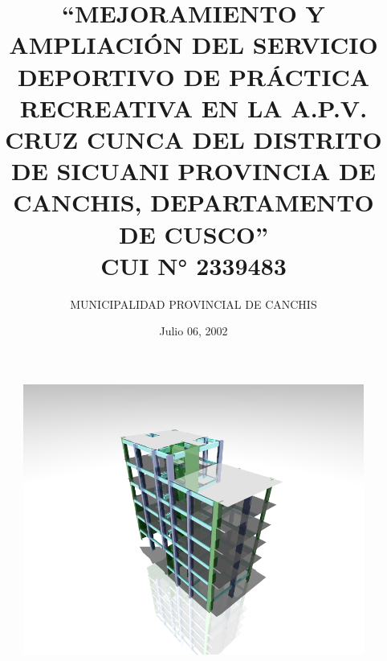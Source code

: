 \documentclass[12pt,addpoints]{article}
\title{\textbf{``MEJORAMIENTO Y AMPLIACIÓN DEL SERVICIO DEPORTIVO DE PRÁCTICA RECREATIVA EN LA A.P.V. CRUZ CUNCA DEL DISTRITO DE SICUANI PROVINCIA DE CANCHIS, DEPARTAMENTO DE CUSCO''\\
CUI N° 2339483
}}
\author{MUNICIPALIDAD PROVINCIAL DE CANCHIS}
\date{Julio 06, 2002}
\renewcommand{\headrulewidth}{0.4pt}
\renewcommand{\footrulewidth}{0.4pt}
\begin{document}
\maketitle
\begin{figure}[h!]
    \centering
    \includegraphics[scale=0.75]{IMAGENES/r2.png}
    \label{fig:my_label}
\end{figure}
\thispagestyle{empty}
\newpage

\clearpage                       %
{                                %
  \pagestyle{empty}              %
  {
    \fancyhf{}%
    \renewcommand{\headrulewidth}{0pt}%
    \renewcommand{\footrulewidth}{0pt}%
  }
    \begin{spacing}{1.35}
    \tableofcontents
  \end{spacing}
  \thispagestyle{empty}  
  \listoffigures
\newpage
\listoftables
  \thispagestyle{empty} 
}


\newpage
%


\clearpage

\end{document}
